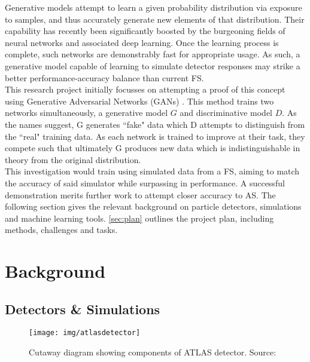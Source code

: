 \documentclass{report}
\begin{document}
Generative models attempt to learn a given probability distribution via exposure to samples, and thus accurately generate new elements of that distribution. Their capability has recently been significantly boosted by the burgeoning fields of neural networks and associated deep learning. Once the learning process is complete, such networks are demonstrably fast for appropriate usage. As such, a generative model capable of learning to simulate detector responses may strike a better performance-accuracy balance than current FS. \\

This research project initially focusses on attempting a proof of this concept using Generative Adversarial Networks (GANs) \cite{gan1}. This method trains two networks simultaneously, a generative model $G$ and discriminative model $D$. As the names suggest, G generates ``fake" data which D attempts to distinguish from the ``real" training data. As each network is trained to improve at their task, they compete such that ultimately G produces new data which is indistinguishable in theory from the original distribution.\\

This investigation would train using simulated data from a FS, aiming to match the accuracy of said simulator while surpassing in performance. A successful demonstration merits further work to attempt closer accuracy to AS. The following section gives the relevant background on particle detectors, simulations and machine learning tools. \cref{sec:plan} outlines the project plan, including methods, challenges and tasks.

\section{Background}
\label{sec:background}



\subsection{Detectors \& Simulations}
\label{sec:detector}

\begin{figure}[H]
	\centering
	\texttt{[image: img/atlasdetector]}
	
	\caption{Cutaway diagram showing components of ATLAS detector. Source: \cite{atlaspic}}
	\label{fig:atlaspic}
	
\end{figure}
\end{document}
